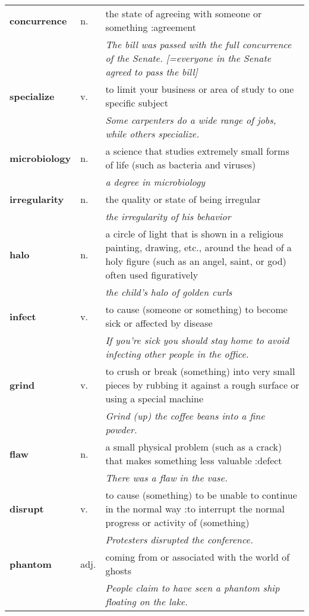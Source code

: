 \documentclass[a4paper]{article}
\begin{document}
\begin{longtable}{llp{11cm}}
\textbf{concurrence} & n. &  the state of agreeing with someone or something :agreement \\
 & & \textit{The bill was passed with the full concurrence of the Senate. [=everyone in the Senate agreed to pass the bill]}\\[0.08cm]
\textbf{specialize} & v. &  to limit your business or area of study to one specific subject \\
 & & \textit{Some carpenters do a wide range of jobs, while others specialize.}\\[0.08cm]
\textbf{microbiology} & n. &  a science that studies extremely small forms of life (such as bacteria and viruses) \\
 & & \textit{a degree in microbiology}\\[0.08cm]
\textbf{irregularity} & n. &  the quality or state of being irregular \\
 & & \textit{the irregularity of his behavior}\\[0.08cm]
\textbf{halo} & n. &  a circle of light that is shown in a religious painting, drawing, etc., around the head of a holy figure (such as an angel, saint, or god) often used figuratively \\
 & & \textit{the child's halo of golden curls}\\[0.08cm]
\textbf{infect} & v. &  to cause (someone or something) to become sick or affected by disease \\
 & & \textit{If you're sick you should stay home to avoid infecting other people in the office.}\\[0.08cm]
\textbf{grind} & v. &  to crush or break (something) into very small pieces by rubbing it against a rough surface or using a special machine \\
 & & \textit{Grind (up) the coffee beans into a fine powder.}\\[0.08cm]
\textbf{flaw} & n. &  a small physical problem (such as a crack) that makes something less valuable :defect \\
 & & \textit{There was a flaw in the vase.}\\[0.08cm]
\textbf{disrupt} & v. &  to cause (something) to be unable to continue in the normal way :to interrupt the normal progress or activity of (something) \\
 & & \textit{Protesters disrupted the conference.}\\[0.08cm]
\textbf{phantom} & adj. &  coming from or associated with the world of ghosts \\
 & & \textit{People claim to have seen a phantom ship floating on the lake.}\\[0.08cm]

\end{longtable}
\end{document}
